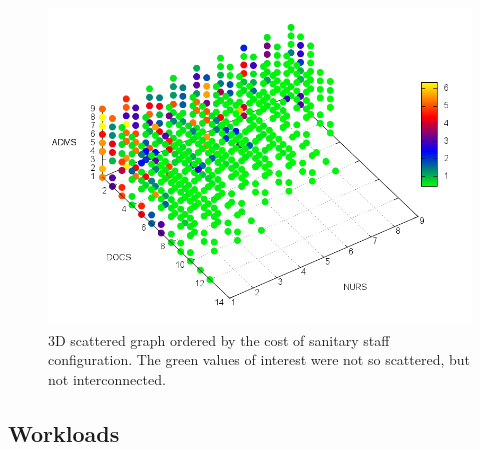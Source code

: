\documentclass[11pt]{article} %
\begin{document}
\begin{figure}[h]
\noindent \begin{centering}
\includegraphics[width=0.88\columnwidth,height=0.2\paperheight]{figs4/3D-scatter-LoS-$2}
\par\end{centering}

\caption{3D scattered graph ordered by the cost of sanitary staff configuration.
The green values of interest were not so scattered, but not interconnected.\label{fig:3D-scattered-LoS-cost} }


\end{figure}

\subsection{Workloads}
\label{ssec:sabadell3}
\end{document}
